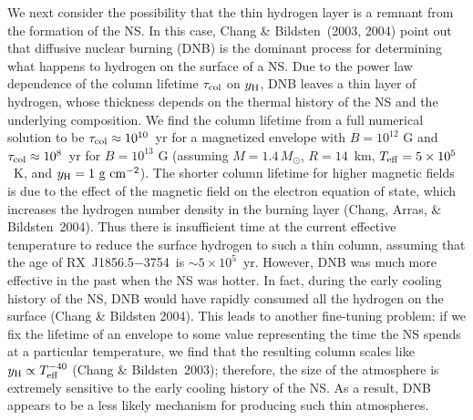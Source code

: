 \documentclass[useAMS,usegraphicx]{mn2e}
\newcommand{\rxjw}{RX~J1856.5$-$3754}
\newcommand{\ycol}{y_{\rm H}}
\newcommand{\teff}{\ensuremath{T_{\rm eff}}}
\begin{document}
We next consider the possibility that the thin hydrogen layer is a
remnant from the formation of the NS.  In this case,
Chang \& Bildsten~(2003, 2004) point out that diffusive nuclear burning (DNB)
is the dominant process for determining what happens to hydrogen on the
surface of a NS.
Due to the power law dependence of the column lifetime $\tau_{\rm col}$
on $\ycol$, DNB leaves a thin layer of hydrogen, whose thickness depends
on the thermal history of the NS and the underlying composition.
We find the column lifetime from a full numerical solution to be
$\tau_{\rm col} \approx 10^{10}$~yr for a magnetized envelope with
$B=10^{12}$ G and $\tau_{\rm col}\approx 10^8$~yr for $B=10^{13}$ G
(assuming $M=1.4\,M_\odot$, $R=14$~km, $\teff=5\times 10^5$~K,
and $\ycol=1\mbox{ g cm$^{-2}$}$).
The shorter column lifetime for higher magnetic fields is due to
the effect of the magnetic field on the electron equation of state, 
which increases the hydrogen number density in the burning layer
(Chang, Arras, \& Bildsten~2004).
Thus there is insufficient time at the current effective temperature to
reduce the surface hydrogen to such a thin column, assuming that the age
of \rxjw\ is $\sim 5 \times 10^5$~yr.
However, DNB was much more effective in the past when the NS was hotter.  
In fact, during the early cooling history of the NS, DNB would have
rapidly consumed all the hydrogen on the surface
(Chang \& Bildsten 2004).
This leads to another fine-tuning problem: if we fix
the lifetime of an envelope to some value representing the time the NS
spends at a particular temperature, we find that the resulting
column scales like $\ycol\propto \teff^{-40}$ (Chang \& Bildsten~2003);
therefore, the size of the atmosphere is extremely sensitive to the early
cooling history of the NS.  As a result, DNB appears to be a less likely
mechanism for producing such thin atmospheres.
\end{document}
